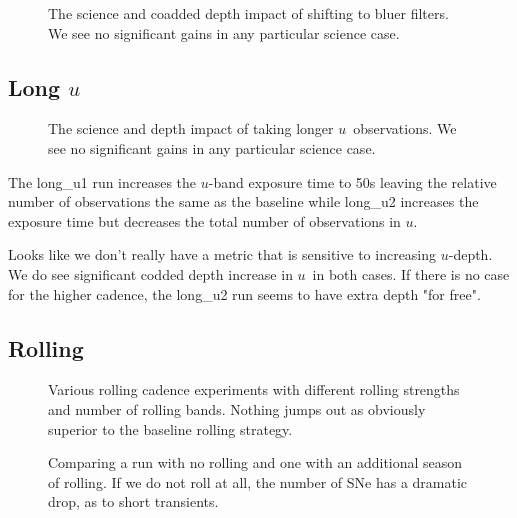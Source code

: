 \begin{figure}
\caption{The science and coadded depth impact of shifting to bluer filters. We see no significant gains in any particular science case.\label{fig:bluer_radar}}
\end{figure}

\subsection{Long $u$}

\begin{figure}
\caption{The science and depth impact of taking longer $u$\ observations. We see no significant gains in any particular science case.\label{fig:long_u}}
\end{figure}


The long\_u1 run increases the $u$-band exposure time to 50s leaving the relative number of observations the same as the baseline while long\_u2 increases the exposure time but decreases the total number of observations in $u$. 

Looks like we don't really have a metric that is sensitive to increasing $u$-depth. We do see significant codded depth increase in $u$\ in both cases. If there is no case for the higher cadence, the long\_u2 run seems to have extra depth "for free".


\subsection{Rolling}


\begin{figure}
\caption{Various rolling cadence experiments with different rolling strengths and number of rolling bands. Nothing jumps out as obviously superior to the baseline rolling strategy. \label{fig:rolling}}
\end{figure}


\begin{figure}
\caption{Comparing a run with no rolling and one with an additional season of rolling. If we do not roll at all, the number of SNe has a dramatic drop, as to short transients. \label{fig:rolling_more}}
\end{figure}


